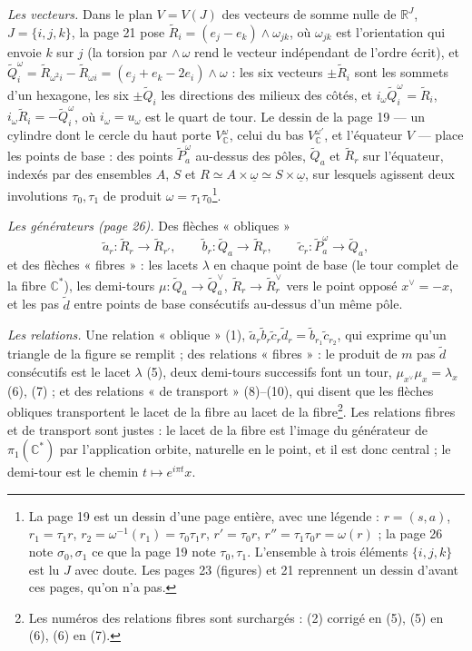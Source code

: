 \documentclass[11pt,a4paper]{article}
\begin{document}
\emph{Les vecteurs.} Dans le plan $V = V(J)$ des vecteurs de somme nulle de
$\mathbb{R}^J$, $J = \{i, j, k\}$, la page 21 pose $\widetilde{R}_i = (e_j -
e_k) \wedge \omega_{jk}$, où $\omega_{jk}$ est l'orientation qui envoie $k$ sur
$j$ (la torsion par $\wedge\,\omega$ rend le vecteur indépendant de l'ordre
écrit), et $\widetilde{Q}^\omega_i = \widetilde{R}_{\omega^2 i} -
\widetilde{R}_{\omega i} = (e_j + e_k - 2e_i) \wedge \omega$ : les six vecteurs
$\pm\widetilde{R}_i$ sont les sommets d'un hexagone, les six
$\pm\widetilde{Q}_i$ les directions des milieux des côtés, et $i_\omega
\widetilde{Q}^\omega_i = \widetilde{R}_i$, $i_\omega \widetilde{R}_i =
-\widetilde{Q}^\omega_i$, où $i_\omega = u_\omega$ est le quart de tour. Le
dessin de la page 19 — un cylindre dont le cercle du haut porte
$V^{\omega}_{\mathbb{C}}$, celui du bas $V^{\omega'}_{\mathbb{C}}$, et
l'équateur $V$ — place les points de base : des points $\widetilde{P}^{\omega}_a$
au-dessus des pôles, $\widetilde{Q}_a$ et $\widetilde{R}_r$ sur l'équateur,
indexés par des ensembles $A$, $S$ et $R \simeq A \times \underline{\omega}
\simeq S \times \underline{\omega}$, sur lesquels agissent deux involutions
$\tau_0, \tau_1$ de produit $\omega = \tau_1\tau_0$\footnote{La page 19 est un
dessin d'une page entière, avec une légende : $r = (s,a)$, $r_1 = \tau_1 r$,
$r_2 = \omega^{-1}(r_1) = \tau_0\tau_1 r$, $r' = \tau_0 r$, $r'' = \tau_1\tau_0
r = \omega(r)$ ; la page 26 note $\sigma_0, \sigma_1$ ce que la page 19 note
$\tau_0, \tau_1$. L'ensemble à trois éléments $\{i,j,k\}$ est lu $J$ avec doute.
Les pages 23 (figures) et 21 reprennent un dessin d'avant ces pages, qu'on
n'a pas.}.

\emph{Les générateurs (page 26).} Des flèches « obliques »
\[
\tilde a_r : \widetilde{R}_r \to \widetilde{R}_{r'}, \qquad \tilde b_r :
\widetilde{Q}_a \to \widetilde{R}_r, \qquad \tilde c_r :
\widetilde{P}^{\omega}_a \to \widetilde{Q}_a,
\]
et des flèches « fibres » : les lacets $\lambda$ en chaque point de base (le
tour complet de la fibre $\mathbb{C}^{*}$), les demi-tours $\mu :
\widetilde{Q}_a \to \widetilde{Q}_a^{\vee}$, $\widetilde{R}_r \to
\widetilde{R}_r^{\vee}$ vers le point opposé $x^{\vee} = -x$, et les pas
$\tilde d$ entre points de base consécutifs au-dessus d'un même pôle.

\emph{Les relations.} Une relation « oblique » (1), $\tilde a_r \tilde b_r
\tilde c_r \tilde d_r = \tilde b_{r_1} \tilde c_{r_2}$, qui exprime qu'un
triangle de la figure se remplit ; des relations « fibres » : le produit de $m$
pas $\tilde d$ consécutifs est le lacet $\lambda$ (5), deux demi-tours
successifs font un tour, $\mu_{x^{\vee}}\mu_x = \lambda_x$ (6), (7) ; et des
relations « de transport » (8)--(10), qui disent que les flèches obliques
transportent le lacet de la fibre au lacet de la fibre\footnote{Les numéros des
relations fibres sont surchargés : (2) corrigé en (5), (5) en (6), (6) en (7).}.
Les relations fibres et de transport sont justes : le lacet de la fibre est
l'image du générateur de $\pi_1(\mathbb{C}^{*})$ par l'application orbite,
naturelle en le point, et il est donc central ; le demi-tour est le chemin
$t \mapsto e^{i\pi t} x$.
\end{document}
